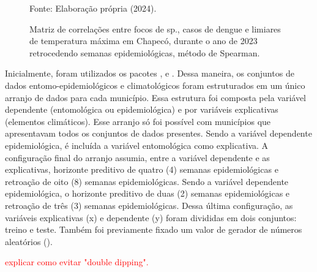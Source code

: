 \documentclass[
	12pt,				%
	openright,			%
	oneside,			%
	a4paper,			%
	english,			%
	french,				%
	spanish,			%
	brazil				%
	dvipsnames, table]{abntex2}
\begin{document}
\begin{figure}[htbp]
    \begin{center}
    \caption{Matriz de correlações entre focos de  sp., casos de dengue e limiares de temperatura máxima em Chapecó, durante o ano de 2023 retrocedendo semanas epidemiológicas, método de Spearman.}
    \label{fig: matriz_corr_LIM_CHAtmax}
        \hfill
    \end{center}
    \small{Fonte: Elaboração própria (2024).}
\end{figure}




\newpage







\indent Inicialmente, foram utilizados os pacotes ,  e  \cite{scikit-learn_2011_pedregosa, sklearn_2013_buitinck}. Dessa maneira, os conjuntos de dados entomo-epidemiológicos e climatológicos foram estruturados em um único arranjo de dados para cada município. Essa estrutura foi composta pela variável dependente (entomológica ou epidemiológica) e por variáveis explicativas (elementos climáticos). Esse arranjo só foi possível com municípios que apresentavam todos os conjuntos de dados presentes. Sendo a variável dependente epidemiológica, é incluída a variável entomológica como explicativa. A configuração final do arranjo assumia, entre a variável dependente e as explicativas, horizonte preditivo de quatro (4) semanas epidemiológicas e retroação de oito (8) semanas epidemiológicas. Sendo a variável dependente epidemiológica, o horizonte preditivo de duas (2) semanas epidemiológicas e retroação de três (3) semanas epidemiológicas. Dessa última configuração, as variáveis explicativas (x) e dependente (y) foram divididas em dois conjuntos: treino e teste. Também foi previamente fixado um valor de gerador de números aleatórios ().

\indent \textcolor{red}{explicar como evitar "double dipping".}
\end{document}
